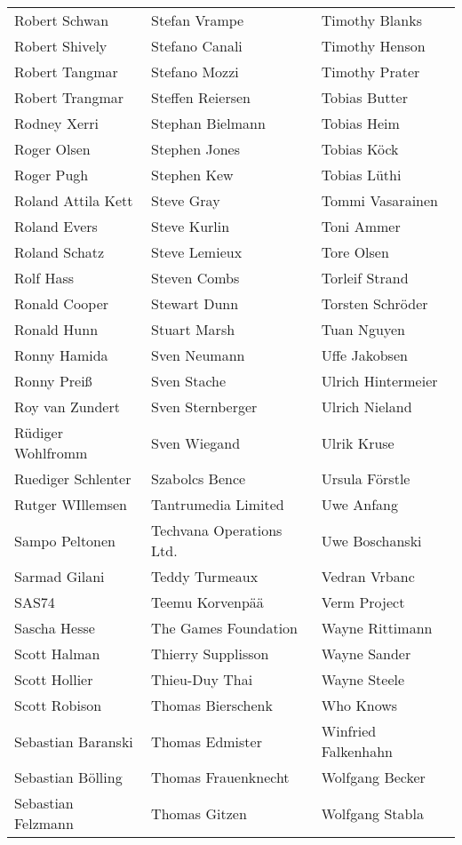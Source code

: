 \begin{small}
\begin{tabular}{p{4cm}p{4cm}p{4cm}}
Robert Schwan & Stefan Vrampe & Timothy Blanks \\
Robert Shively & Stefano Canali & Timothy Henson \\
Robert Tangmar & Stefano Mozzi & Timothy Prater \\
Robert Trangmar & Steffen Reiersen & Tobias Butter \\
Rodney Xerri & Stephan Bielmann & Tobias Heim \\
Roger Olsen & Stephen Jones & Tobias Köck \\
Roger Pugh & Stephen Kew & Tobias Lüthi \\
Roland Attila Kett & Steve Gray & Tommi Vasarainen \\
Roland Evers & Steve Kurlin & Toni Ammer \\
Roland Schatz & Steve Lemieux & Tore Olsen \\
Rolf Hass & Steven Combs & Torleif Strand \\
Ronald Cooper & Stewart Dunn & Torsten Schröder \\
Ronald Hunn & Stuart Marsh & Tuan Nguyen \\
Ronny Hamida & Sven Neumann & Uffe Jakobsen \\
Ronny Preiß & Sven Stache & Ulrich Hintermeier \\
Roy van Zundert & Sven Sternberger & Ulrich Nieland \\
Rüdiger Wohlfromm & Sven Wiegand & Ulrik Kruse \\
Ruediger Schlenter & Szabolcs Bence & Ursula Förstle \\
Rutger WIllemsen & Tantrumedia Limited & Uwe Anfang \\
Sampo Peltonen & Techvana Operations Ltd. & Uwe Boschanski \\
Sarmad Gilani & Teddy Turmeaux & Vedran Vrbanc \\
SAS74 & Teemu Korvenpää & Verm Project \\
Sascha Hesse & The Games Foundation & Wayne Rittimann \\
Scott Halman & Thierry Supplisson & Wayne Sander \\
Scott Hollier & Thieu-Duy Thai & Wayne Steele \\
Scott Robison & Thomas Bierschenk & Who Knows \\
Sebastian Baranski & Thomas Edmister & Winfried Falkenhahn \\
Sebastian Bölling & Thomas Frauenknecht & Wolfgang Becker \\
Sebastian Felzmann & Thomas Gitzen & Wolfgang Stabla \\

\end{tabular}
\end{small}
